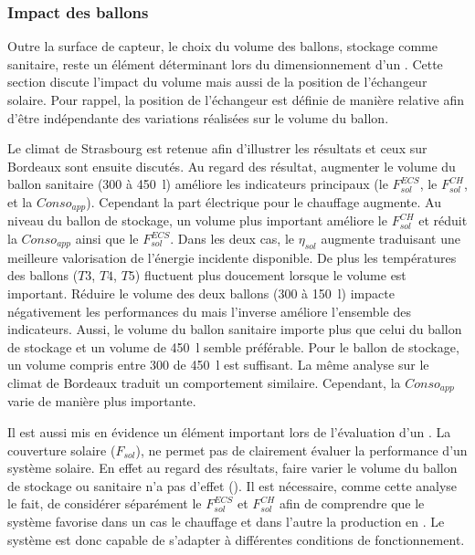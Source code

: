 \subsubsection{Impact des ballons} %
\label{ssub:impact_des_ballons}
Outre la surface de capteur, le choix du volume des ballons, stockage comme sanitaire,
reste un élément déterminant lors du dimensionnement d’un . Cette section discute
l’impact du volume mais aussi de la position de l’échangeur solaire. Pour rappel, la
position de l’échangeur est définie de manière relative afin d’être indépendante des
variations réalisées sur le volume du ballon.

Le climat de Strasbourg est retenue afin d’illustrer les résultats et ceux sur Bordeaux
sont ensuite discutés. Au regard des résultat, augmenter le volume du ballon sanitaire
(\num{300} à \SI{450}{\litre}) améliore les indicateurs principaux (le $F_{sol}^{ECS}$, le
$F_{sol}^{CH}$, et la $Conso_{app}$). Cependant la part électrique pour le chauffage
augmente. Au niveau du ballon de stockage, un volume plus important améliore le $F_{sol}^{CH}$
et réduit la $Conso_{app}$ ainsi que le $F_{sol}^{ECS}$. Dans les deux cas, le $\eta_{sol}$
augmente traduisant une meilleure valorisation de l’énergie incidente disponible.
De plus les températures des ballons ($T3$, $T4$, $T5$) fluctuent plus doucement lorsque le
volume est important. Réduire le volume des deux ballons (\num{300} à \SI{150}{\litre})
impacte négativement les performances du  mais l’inverse améliore l’ensemble des
indicateurs. Aussi, le volume du ballon sanitaire importe plus que celui du ballon de
stockage et un volume de \SI{450}{\litre} semble préférable. Pour le ballon de stockage,
un volume compris entre \num{300} de \SI{450}{\litre} est suffisant. La même analyse sur
le climat de Bordeaux traduit un comportement similaire. Cependant, la $Conso_{app}$
varie de manière plus importante.

Il est aussi mis en évidence un élément important lors de l’évaluation d’un . La
couverture solaire ($F_{sol}$), ne permet pas de clairement évaluer la performance d’un
système solaire. En effet au regard des résultats, faire varier le volume du ballon de
stockage ou sanitaire n’a pas d’effet (). Il est
nécessaire, comme cette analyse le fait, de considérer séparément le $F_{sol}^{ECS}$ et
$F_{sol}^{CH}$ afin de comprendre que le système favorise dans un cas le chauffage et dans
l’autre la production en . Le système est donc capable de s’adapter à
différentes conditions de fonctionnement.

